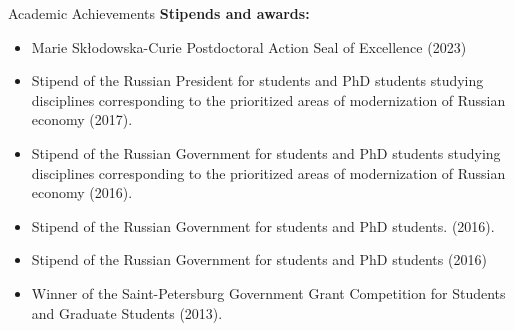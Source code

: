 \documentclass{resume} %
\begin{document}
\begin{rSection}{Academic Achievements}
{\bf Stipends and awards:}
\begin{itemize}
    \item Marie Sk\l{}odowska-Curie Postdoctoral Action Seal of Excellence (2023)
    \item Stipend of the Russian President for students and PhD students studying disciplines corresponding to the prioritized areas of modernization of Russian economy (2017). %
    \item Stipend of the Russian Government for students and PhD students studying disciplines corresponding to the prioritized areas of modernization of Russian economy (2016). %
    \item Stipend of the Russian Government for students and PhD students. (2016). %
    \item Stipend of the Russian Government for students and PhD students (2016)
    \item Winner of the Saint-Petersburg Government Grant Competition for Students and Graduate Students (2013). %
\end{itemize}
\end{rSection}

\newpage
\end{document}
